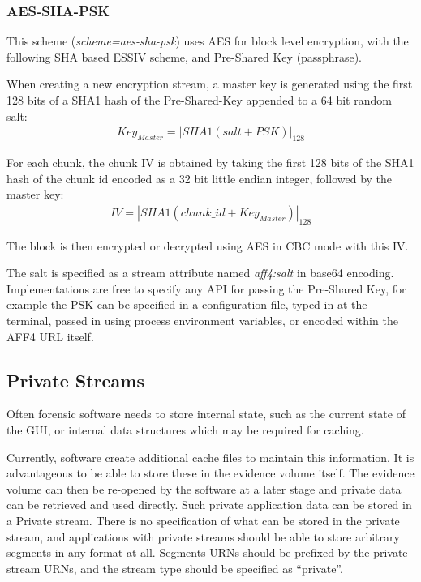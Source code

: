 \documentclass[10pt, conference]{IEEEtran}
\begin{document}
\subsubsection{AES-SHA-PSK}
This scheme ({\em scheme=aes-sha-psk}) uses AES for block level
encryption, with the following SHA based ESSIV scheme, and Pre-Shared
Key (passphrase).

When creating a new encryption stream, a master key is generated using
the first 128 bits of a SHA1 hash of the Pre-Shared-Key appended to a
64 bit random salt:
\begin{eqnarray}
Key_{Master} = \left | SHA1(salt + PSK) \right | _{128}
\end{eqnarray}

For each chunk, the chunk IV is obtained by taking the first 128 bits
of the SHA1 hash of the chunk id encoded as a 32 bit little endian
integer, followed by the master key:
\begin{eqnarray}
IV = \left | SHA1(chunk\_id + Key_{Master}) \right | _{128}
\end{eqnarray}

The block is then encrypted or decrypted using AES in CBC mode with
this IV.

The salt is specified as a stream attribute named {\em aff4:salt} in
base64 encoding. Implementations are free to specify any API for
passing the Pre-Shared Key, for example the PSK can be specified in a
configuration file, typed in at the terminal, passed in using process
environment variables, or encoded within the AFF4 URL itself.

\subsection{Private Streams}
Often forensic software needs to store internal state, such as the
current state of the GUI, or internal data structures which may be
required for caching. 

Currently, software create additional cache files to maintain this
information. It is advantageous to be able to store these in the
evidence volume itself. The evidence volume can then be re-opened by
the software at a later stage and private data can be retrieved and
used directly. Such private application data can be stored in a
Private stream. There is no specification of what can be stored in the
private stream, and applications with private streams should be able
to store arbitrary segments in any format at all. Segments URNs should
be prefixed by the private stream URNs, and the stream type should be
specified as ``private''.
\end{document}

